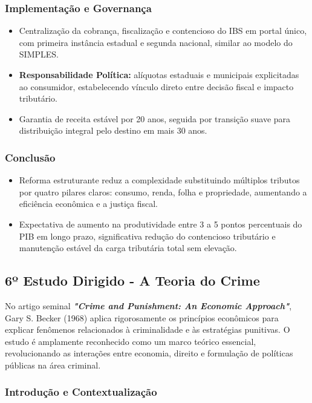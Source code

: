 \documentclass[a4paper,12pt]{article}[abntex2]
\begin{document}
\subsubsection{\textbf{Implementação e Governança}}

\begin{itemize}
  \item Centralização da cobrança, fiscalização e contencioso do IBS em portal único, com primeira instância estadual e segunda nacional, similar ao modelo do SIMPLES.
  \item \textbf{Responsabilidade Política:} alíquotas estaduais e municipais explicitadas ao consumidor, estabelecendo vínculo direto entre decisão fiscal e impacto tributário.
  \item Garantia de receita estável por 20 anos, seguida por transição suave para distribuição integral pelo destino em mais 30 anos.
\end{itemize}

\subsubsection{\textbf{Conclusão}}

\begin{itemize}
  \item Reforma estruturante reduz a complexidade substituindo múltiplos tributos por quatro pilares claros: consumo, renda, folha e propriedade, aumentando a eficiência econômica e a justiça fiscal.
  \item Expectativa de aumento na produtividade entre 3 a 5 pontos percentuais do PIB em longo prazo, significativa redução do contencioso tributário e manutenção estável da carga tributária total sem elevação.
\end{itemize}

\newpage
\subsection{\textbf{6º Estudo Dirigido - A Teoria do Crime}}

No artigo seminal \textit{\textbf{"Crime and Punishment: An Economic Approach"}}, Gary S. Becker (1968) aplica rigorosamente os princípios econômicos para explicar fenômenos relacionados à criminalidade e às estratégias punitivas. O estudo é amplamente reconhecido como um marco teórico essencial, revolucionando as interações entre economia, direito e formulação de políticas públicas na área criminal.

\subsubsection{\textbf{Introdução e Contextualização}}
\end{document}
